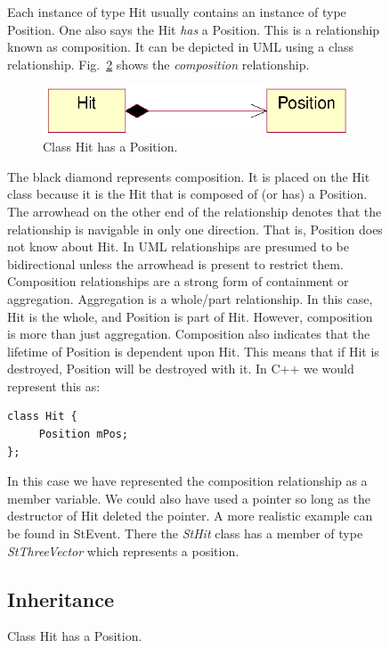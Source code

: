 \documentclass[twoside]{article}
\newcommand{\name}[1]{\textsl{#1}}%
\newcommand{\StEvent}{\textsf{StEvent}}
\begin{document}
\begin{figure}[htb]
\begin{center}
Each instance of type Hit usually contains an instance of type
Position. One also says the Hit \emph{has} a Position. This is a
relationship known as composition. It can be depicted in UML using a
class relationship.  Fig.~\ref{fig:umlComposition} shows the
\emph{composition} relationship.
\begin{figure}[htb]
    \begin{center}
        \includegraphics{umlComposition.eps}
        \caption{Class Hit has a Position.}
        \label{fig:umlComposition}
    \end{center}
\end{figure}
The black diamond represents composition. It is placed on the Hit
class because it is the Hit that is composed of (or has) a Position.
The arrowhead on the other end of the relationship denotes that the
relationship is navigable in only one direction. That is, Position
does not know about Hit. In UML relationships are presumed to be
bidirectional unless the arrowhead is present to restrict them.
Composition relationships are a strong form of containment or
aggregation. Aggregation is a whole/part relationship. In this case,
Hit is the whole, and Position is part of Hit. However, composition is
more than just aggregation. Composition also indicates that the
lifetime of Position is dependent upon Hit. This means that if Hit is
destroyed, Position will be destroyed with it.  In C++ we would
represent this as:

{\footnotesize
\begin{verbatim}
class Hit {
     Position mPos;
};
\end{verbatim}
}%

In this case we have represented the composition relationship as a
member variable. We could also have used a pointer so long as the
destructor of Hit deleted the pointer.  A more realistic example can
be found in \StEvent. There the \name{StHit} class has a member of
type \name{StThreeVector} which represents a position.

\subsection{Inheritance}


\end{center}
\end{figure}
\end{document}
